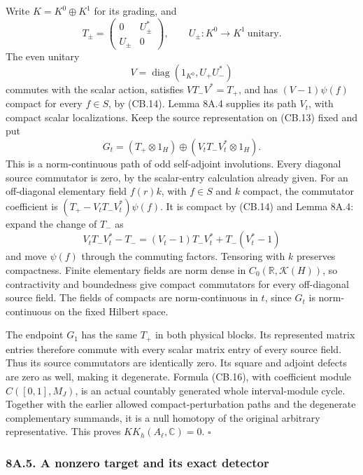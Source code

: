 \documentclass[
  11pt,
]{article}
\begin{document}
Write \(K=K^0\oplus K^1\) for its grading, and \[
 T_\pm=\begin{pmatrix}0&U_\pm^*\\ U_\pm&0\end{pmatrix},
 \qquad U_\pm:K^0\longrightarrow K^1\ \mathrm{unitary}.
\] The even unitary \[
 V=\operatorname{diag}(1_{K^0},U_+U_-^*)
 \tag{CB.15}
\] commutes with the scalar action, satisfies \(VT_-V^*=T_+\), and has
\((V-1)\psi(f)\) compact for every \(f\in S\), by (CB.14). Lemma 8A.4
supplies its path \(V_t\), with compact scalar localizations. Keep the
source representation on (CB.13) fixed and put \[
 G_t=(T_+\otimes1_H)\oplus(V_tT_-V_t^*\otimes1_H).
 \tag{CB.16}
\] This is a norm-continuous path of odd self-adjoint involutions. Every
diagonal source commutator is zero, by the scalar-entry calculation
already given. For an off-diagonal elementary field \(f(r)k\), with
\(f\in S\) and \(k\) compact, the commutator coefficient is
\((T_+-V_tT_-V_t^*)\psi(f)\). It is compact by (CB.14) and Lemma 8A.4:
expand the change of \(T_-\) as \[
 V_tT_-V_t^*-T_-
 =(V_t-1)T_-V_t^*+T_-(V_t^*-1)
\] and move \(\psi(f)\) through the commuting factors. Tensoring with
\(k\) preserves compactness. Finite elementary fields are norm dense in
\(C_0(\mathbb R,\mathcal K(H))\), so contractivity and boundedness give
compact commutators for every off-diagonal source field. The fields of
compacts are norm-continuous in \(t\), since \(G_t\) is norm-continuous
on the fixed Hilbert space.

The endpoint \(G_1\) has the same \(T_+\) in both physical blocks. Its
represented matrix entries therefore commute with every scalar matrix
entry of every source field. Thus its source commutators are identically
zero. Its square and adjoint defects are zero as well, making it
degenerate. Formula (CB.16), with coefficient module \(C([0,1],M_J)\),
is an actual countably generated whole interval-module cycle. Together
with the earlier allowed compact-perturbation paths and the degenerate
complementary summands, it is a null homotopy of the original arbitrary
representative. This proves \(KK_h(A_\ell,\mathbb C)=0\). \(\square\)

\subsubsection{8A.5. A nonzero target and its exact
detector}\label{a.5.-a-nonzero-target-and-its-exact-detector}
\end{document}
